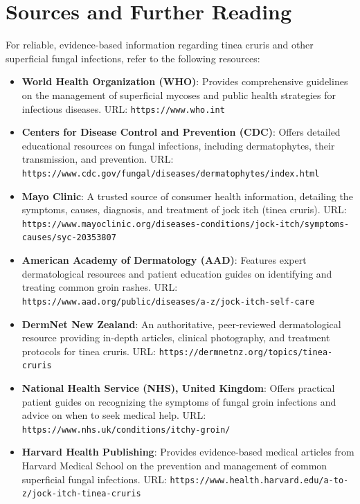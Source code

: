 \section*{Sources and Further Reading}
For reliable, evidence-based information regarding tinea cruris and other superficial fungal infections, refer to the following resources:
\begin{itemize}
    \item \textbf{World Health Organization (WHO)}: Provides comprehensive guidelines on the management of superficial mycoses and public health strategies for infectious diseases. URL: \texttt{https://www.who.int}
    \item \textbf{Centers for Disease Control and Prevention (CDC)}: Offers detailed educational resources on fungal infections, including dermatophytes, their transmission, and prevention. URL: \texttt{https://www.cdc.gov/fungal/diseases/dermatophytes/index.html}
    \item \textbf{Mayo Clinic}: A trusted source of consumer health information, detailing the symptoms, causes, diagnosis, and treatment of jock itch (tinea cruris). URL: \texttt{https://www.mayoclinic.org/diseases-conditions/jock-itch/symptoms-causes/syc-20353807}
    \item \textbf{American Academy of Dermatology (AAD)}: Features expert dermatological resources and patient education guides on identifying and treating common groin rashes. URL: \texttt{https://www.aad.org/public/diseases/a-z/jock-itch-self-care}
    \item \textbf{DermNet New Zealand}: An authoritative, peer-reviewed dermatological resource providing in-depth articles, clinical photography, and treatment protocols for tinea cruris. URL: \texttt{https://dermnetnz.org/topics/tinea-cruris}
    \item \textbf{National Health Service (NHS), United Kingdom}: Offers practical patient guides on recognizing the symptoms of fungal groin infections and advice on when to seek medical help. URL: \texttt{https://www.nhs.uk/conditions/itchy-groin/}
    \item \textbf{Harvard Health Publishing}: Provides evidence-based medical articles from Harvard Medical School on the prevention and management of common superficial fungal infections. URL: \texttt{https://www.health.harvard.edu/a-to-z/jock-itch-tinea-cruris}
\end{itemize}